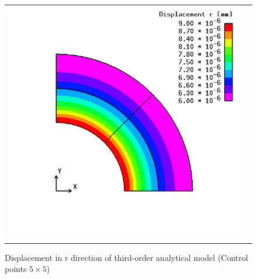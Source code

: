 \begin{figure}[htbp]
\begin{tabular}{cc}
\begin{minipage}[t]{0.45\hsize}
      \includegraphics[keepaspectratio, scale=0.3]
      {fig/result_data_etc/iga/order3/3_5x5.png}
      \caption{Displacement in r direction of third-order analytical model (Control points $5\times 5$)}
      \label{fig:iga 02}
    \end{minipage}
  \end{tabular}
\end{figure}

